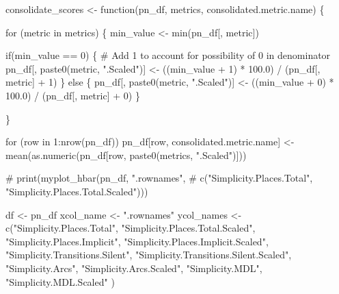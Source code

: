 \documentclass[]{article}
\newenvironment{Shaded}{\begin{snugshade}}{\end{snugshade}}
\newcommand{\KeywordTok}[1]{\textcolor[rgb]{0.94,0.87,0.69}{{#1}}}
\newcommand{\DecValTok}[1]{\textcolor[rgb]{0.86,0.86,0.80}{{#1}}}
\newcommand{\FloatTok}[1]{\textcolor[rgb]{0.75,0.75,0.82}{{#1}}}
\newcommand{\StringTok}[1]{\textcolor[rgb]{0.80,0.58,0.58}{{#1}}}
\newcommand{\CommentTok}[1]{\textcolor[rgb]{0.50,0.62,0.50}{{#1}}}
\newcommand{\NormalTok}[1]{\textcolor[rgb]{0.80,0.80,0.80}{{#1}}}
\begin{document}
\begin{Shaded}
\begin{Highlighting}[]
\NormalTok{consolidate_scores <-}\StringTok{ }\NormalTok{function(pn_df, metrics, consolidated.metric.name) \{}
    
    \NormalTok{for (metric in metrics) \{}
        \NormalTok{min_value <-}\StringTok{ }\KeywordTok{min}\NormalTok{(pn_df[, metric])}
        
        \NormalTok{if(min_value ==}\StringTok{ }\DecValTok{0}\NormalTok{) \{}
            \CommentTok{# Add 1 to account for possibility of 0 in denominator}
            \NormalTok{pn_df[, }\KeywordTok{paste0}\NormalTok{(metric, }\StringTok{".Scaled"}\NormalTok{)] <-}\StringTok{ }
\StringTok{                }\NormalTok{((min_value +}\StringTok{ }\DecValTok{1}\NormalTok{) *}\StringTok{ }\FloatTok{100.0}\NormalTok{) /}\StringTok{ }\NormalTok{(pn_df[, metric] +}\StringTok{ }\DecValTok{1}\NormalTok{)}
        \NormalTok{\} else \{}
            \NormalTok{pn_df[, }\KeywordTok{paste0}\NormalTok{(metric, }\StringTok{".Scaled"}\NormalTok{)] <-}\StringTok{ }
\StringTok{                }\NormalTok{((min_value +}\StringTok{ }\DecValTok{0}\NormalTok{) *}\StringTok{ }\FloatTok{100.0}\NormalTok{) /}\StringTok{ }\NormalTok{(pn_df[, metric] +}\StringTok{ }\DecValTok{0}\NormalTok{)}
        \NormalTok{\}}
            
    \NormalTok{\}}
    
    \NormalTok{for (row in }\DecValTok{1}\NormalTok{:}\KeywordTok{nrow}\NormalTok{(pn_df))}
        \NormalTok{pn_df[row, consolidated.metric.name] <-}\StringTok{ }
\StringTok{            }\KeywordTok{mean}\NormalTok{(}\KeywordTok{as.numeric}\NormalTok{(pn_df[row, }\KeywordTok{paste0}\NormalTok{(metrics, }\StringTok{".Scaled"}\NormalTok{)]))}

\CommentTok{#     print(myplot_hbar(pn_df, ".rownames", }
\CommentTok{#                       c("Simplicity.Places.Total", "Simplicity.Places.Total.Scaled")))}
    
    \NormalTok{df <-}\StringTok{ }\NormalTok{pn_df}
    \NormalTok{xcol_name <-}\StringTok{ ".rownames"}
    \NormalTok{ycol_names <-}\StringTok{ }\KeywordTok{c}\NormalTok{(}\StringTok{"Simplicity.Places.Total"}\NormalTok{, }\StringTok{"Simplicity.Places.Total.Scaled"}\NormalTok{,}
                    \StringTok{"Simplicity.Places.Implicit"}\NormalTok{, }\StringTok{"Simplicity.Places.Implicit.Scaled"}\NormalTok{,}
                    \StringTok{"Simplicity.Transitions.Silent"}\NormalTok{, }\StringTok{"Simplicity.Transitions.Silent.Scaled"}\NormalTok{,}
                    \StringTok{"Simplicity.Arcs"}\NormalTok{, }\StringTok{"Simplicity.Arcs.Scaled"}\NormalTok{,}
                    \StringTok{"Simplicity.MDL"}\NormalTok{, }\StringTok{"Simplicity.MDL.Scaled"}
                    \NormalTok{)}
    

\end{Highlighting}
\end{Shaded}
\end{document}
